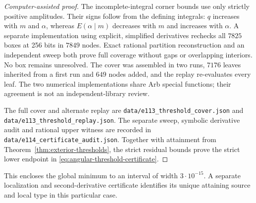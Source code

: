 \documentclass[11pt,a4paper]{article}
\theoremstyle{remark}\newtheorem{remark}[theorem]{Remark}
\begin{document}
\begin{proof}[Computer-assisted proof]
The incomplete-integral corner bounds use only strictly positive
amplitudes. Their signs follow from the defining integrals: $q$ increases
with $m$ and $\alpha$, whereas $E(\alpha\mid m)$ decreases with $m$
and increases with $\alpha$. A separate implementation using explicit,
simplified derivatives rechecks all $7825$ boxes at 256 bits in
$7849$ nodes. Exact rational partition reconstruction and an independent
sweep both prove full coverage without gaps or overlapping interiors.
No box remains unresolved.  The cover was assembled in two runs, $7176$
leaves inherited from a first run and $649$ nodes added, and the replay
re-evaluates every leaf.  The two numerical implementations share Arb
special functions; their agreement is not an independent-library review.

The full cover and alternate replay are
\nolinkurl{data/e113_threshold_cover.json} and
\nolinkurl{data/e113_threshold_replay.json}.
The separate sweep, symbolic derivative audit and rational upper witness
are recorded in \nolinkurl{data/e114_certificate_audit.json}.
Together with attainment from Theorem~\ref{thm:exterior-thresholds},
the strict residual bounds prove the strict lower endpoint in
\eqref{eq:angular-threshold-certificate}.
\end{proof}

This encloses the global minimum to an interval of width $3\cdot10^{-15}$.
A separate localization and second-derivative certificate identifies its
unique attaining source and local type in this particular case.
\end{document}
